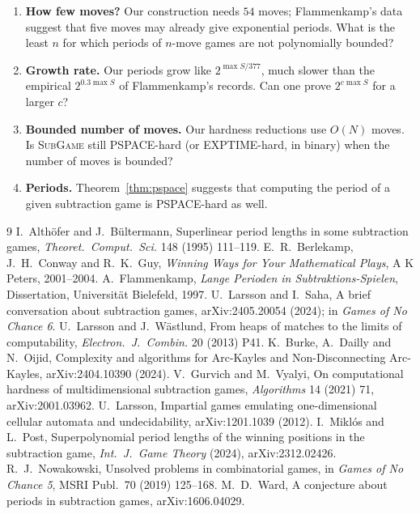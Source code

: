 \documentclass[11pt]{article}
\theoremstyle{definition}
\begin{document}
\begin{enumerate}[leftmargin=*]
\item \textbf{How few moves?}  Our construction needs $54$ moves; Flammenkamp's data suggest that
five moves may already give exponential periods.  What is the least $n$ for which periods of
$n$-move games are not polynomially bounded?
\item \textbf{Growth rate.}  Our periods grow like $2^{\max S/377}$, much slower than the empirical
$2^{0.3\max S}$ of Flammenkamp's records.  Can one prove $2^{c\max S}$ for a larger $c$?
\item \textbf{Bounded number of moves.}  Our hardness reductions use $O(N)$ moves.  Is
\textsc{SubGame} still PSPACE-hard (or EXPTIME-hard, in binary) when the number of moves is bounded?
\item \textbf{Periods.}  Theorem~\ref{thm:pspace} suggests that computing the period of a given
subtraction game is PSPACE-hard as well.
\end{enumerate}

\begin{thebibliography}{9}
 I.~Althöfer and J.~Bültermann, Superlinear period lengths in some subtraction games,
\emph{Theoret.\ Comput.\ Sci.} 148 (1995) 111--119.
 E.~R.~Berlekamp, J.~H.~Conway and R.~K.~Guy, \emph{Winning Ways for Your Mathematical
Plays}, A K Peters, 2001--2004.
 A.~Flammenkamp, \emph{Lange Perioden in Subtraktions-Spielen}, Dissertation,
Universität Bielefeld, 1997.
 U.~Larsson and I.~Saha, A brief conversation about subtraction games,
arXiv:2405.20054 (2024); in \emph{Games of No Chance 6}.
 U.~Larsson and J.~Wästlund, From heaps of matches to the limits of computability,
\emph{Electron.\ J.\ Combin.} 20 (2013) P41.
 K.~Burke, A.~Dailly and N.~Oijid, Complexity and algorithms for Arc-Kayles and
Non-Disconnecting Arc-Kayles, arXiv:2404.10390 (2024).
 V.~Gurvich and M.~Vyalyi, On computational hardness of multidimensional subtraction
games, \emph{Algorithms} 14 (2021) 71, arXiv:2001.03962.
 U.~Larsson, Impartial games emulating one-dimensional cellular automata and
undecidability, arXiv:1201.1039 (2012).
 I.~Miklós and L.~Post, Superpolynomial period lengths of the winning positions in the
subtraction game, \emph{Int.\ J.\ Game Theory} (2024), arXiv:2312.02426.
 R.~J.~Nowakowski, Unsolved problems in combinatorial games, in \emph{Games of
No Chance 5}, MSRI Publ.\ 70 (2019) 125--168.
 M.~D.~Ward, A conjecture about periods in subtraction games, arXiv:1606.04029.
\end{thebibliography}
\end{document}
